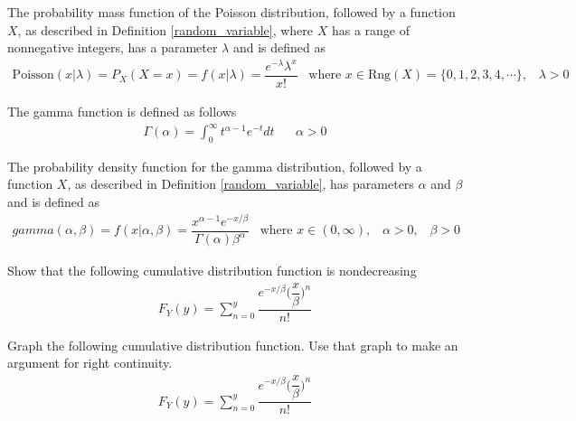 \begin{definition}
The probability mass function of the Poisson distribution, followed by a function $X$, as described in Definition \ref{random_variable}, where $X$ has a range of nonnegative integers, has a parameter $\lambda$ and is defined as
\begin{align*}
    \text{Poisson}(x | \lambda) = P_{X}(X = x) = f(x | \lambda) =  \dfrac{e^{-\lambda} \lambda^{x}}{x!} \hspace{10pt} \text{where} \hspace{4pt} x \in \text{Rng}(X) = \{0, 1, 2, 3, 4, \cdots\}, \hspace{10pt} \lambda > 0
\end{align*}
\end{definition}

\begin{definition}
The gamma function is defined as follows
\begin{align*}
    \Gamma(\alpha) = \int_{0}^{\infty} t^{\alpha - 1} e^{-t} dt \hspace{20pt} \alpha > 0 
\end{align*}
\end{definition}

\begin{definition}
The probability density function for the gamma distribution, followed by a function $X$, as described in Definition \ref{random_variable}, has parameters $\alpha$ and $\beta$ and is defined as 
\begin{align*}
    gamma(\alpha, \beta) = f(x | \alpha, \beta) = \dfrac{x^{\alpha - 1} e^{-x/\beta}}{\Gamma(\alpha)\beta^{\alpha}} \hspace{10pt} \text{where} \hspace{4pt} x \in (0, \infty), \hspace{10pt} \alpha > 0, \hspace{10pt} \beta > 0
\end{align*}
\end{definition}

\begin{exercise}
Show that the following cumulative distribution function is nondecreasing
\begin{align*}
    F_{Y}(y) = \sum_{n = 0}^{y} \dfrac{e^{-x/\beta}\Big(\dfrac{x}{\beta}\Big)^{n}}{n!}
\end{align*}
\end{exercise}

\begin{exercise}
Graph the following cumulative distribution function. Use that graph to make an argument for right continuity.
\begin{align*}
    F_{Y}(y) = \sum_{n = 0}^{y} \dfrac{e^{-x/\beta}\Big(\dfrac{x}{\beta}\Big)^{n}}{n!}
\end{align*}
\end{exercise}

